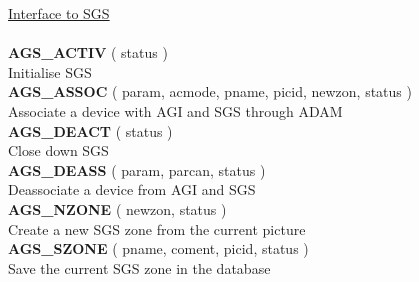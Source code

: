 \begin{tabbing}
\underline{Interface to SGS}\\ \\
{\bf AGS\_ACTIV} \> ( status )\\
                 \> Initialise SGS\\[1ex]
{\bf AGS\_ASSOC} \> ( param, acmode, pname, picid, newzon, status )\\
                 \> Associate a device with AGI and SGS through ADAM\\[1ex]
{\bf AGS\_DEACT} \> ( status )\\
                 \> Close down SGS\\[1ex]
{\bf AGS\_DEASS} \> ( param, parcan, status )\\
                 \> Deassociate a device from AGI and SGS\\[1ex]
{\bf AGS\_NZONE} \> ( newzon, status )\\
                 \> Create a new SGS zone from the current picture\\[1ex]
{\bf AGS\_SZONE} \> ( pname, coment, picid, status )\\
                 \> Save the current SGS zone in the database\\[2ex]


\end{tabbing}

